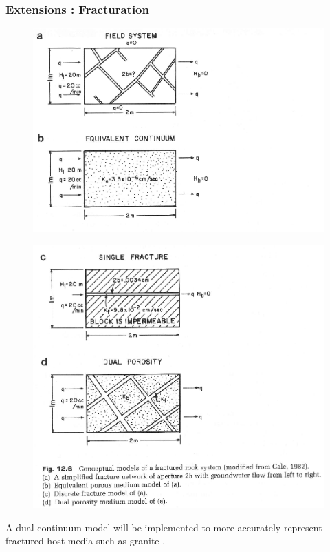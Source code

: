 

\begin{frame}[ctb!]
  \frametitle{Extensions : Fracturation}
    \begin{minipage}{0.49\textwidth}
      \begin{figure}[h!]
        \includegraphics[width=\textwidth]{fracturesAB.eps}
        \label{fig:fracturesAB}
      \end{figure}
    \end{minipage}
    \hspace{.01cm}
    \begin{minipage}{0.49\textwidth}
      \begin{figure}[h!]
        \includegraphics[width=\textwidth]{fracturesCD.eps}
        \label{fig:fracturesCD}
      \end{figure}
    \end{minipage}

  A dual continuum model will be implemented to more accurately represent 
  fractured host media such as granite \cite{anderson_applied_1992}.
\end{frame}


